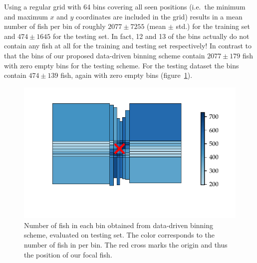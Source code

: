 \documentclass[nobib, a4paper]{tufte-handout}
\begin{document}
Using a regular grid with 64 bins covering all seen positions (i.e.\ the minimum and maximum $x$ and $y$ coordinates are included in the grid) results in a mean number of fish per bin of roughly \(2077\pm 7255\) (mean $\pm$ std.) for the training set and \(474 \pm 1645\) for the testing set.
In fact, 12 and 13 of the bins actually do not contain any fish at all for the training and testing set respectively!
In contrast to that the bins of our proposed data-driven binning scheme contain $2077 \pm 179$ fish with zero empty bins for the testing scheme.
For the testing dataset the bins contain $474 \pm 139$ fish, again with zero empty bins (figure~\ref{fig:occupancy}).

\begin{figure}[htb]
  \includegraphics{rf_occupancy_test}
   \centering
   \caption{Number of fish in each bin obtained from data-driven binning scheme, evaluated on testing set.
     The color corresponds to the number of fish in per bin.
   The red cross marks the origin and thus the position of our focal fish.}
   \label{fig:occupancy}
\end{figure}
\end{document}
